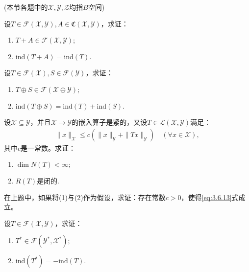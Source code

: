 \documentclass[../../main.tex]{subfiles}%
\begin{document}
(本节各题中的$\mathscr{X},\mathscr{Y},\mathscr{Z}$均指$B$空间)
\begin{example}
设$T\in\mathscr{F}(\mathscr{X},\mathscr{Y}),A\in\mathfrak{C}(\mathscr{X},\mathscr{Y})$，求证：
\begin{enumerate}[(1)]
\item $T+A\in\mathscr{F}(\mathscr{X},\mathscr{Y})$;
\item $\mathrm{ind}(T+A)=\mathrm{ind}(T)$.
\end{enumerate}
\end{example}

\begin{example}
设$T\in\mathscr{F}(\mathscr{X}),S\in\mathscr{F}(\mathscr{Y})$，求证：
\begin{enumerate}[(1)]
\item $T\oplus S\in\mathscr{F}(\mathscr{X}\oplus\mathscr{Y})$;
\item $\mathrm{ind}(T\oplus S)=\mathrm{ind}(T)+\mathrm{ind}(S)$.
\end{enumerate}
\end{example}

\begin{example}
设$\mathscr{X}\subseteq\mathscr{Y}$，并且$\mathscr{X}\to\mathscr{Y}$的嵌入算子是紧的，又设$T\in\mathscr{L}(\mathscr{X},\mathscr{Y})$满足：
\begin{align}
\|x\|_{\mathscr{X}}\leqslant c\left(\|x\|_{\mathscr{Y}}+\|Tx\|_{\mathscr{Y}}\right)\quad(\forall x\in\mathscr{X}),\label{eq:3.6.13}
\end{align}
其中$c$是一常数。求证：
\begin{enumerate}[(1)]
\item $\dim N(T)<\infty$;
\item $R(T)$是闭的.
\end{enumerate}
\end{example}

\begin{example}
在上题中，如果将(1)与(2)作为假设，求证：存在常数$c>0$，使得\eqref{eq:3.6.13}式成立。
\end{example}

\begin{example}
设$T\in\mathscr{F}(\mathscr{X},\mathscr{Y})$，求证：
\begin{enumerate}[(1)]
\item $T^{*}\in\mathscr{F}(\mathscr{Y}^{*},\mathscr{X}^{*})$;
\item $\mathrm{ind}(T^{*})=-\mathrm{ind}(T)$.
\end{enumerate}
\end{example}
\end{document}
